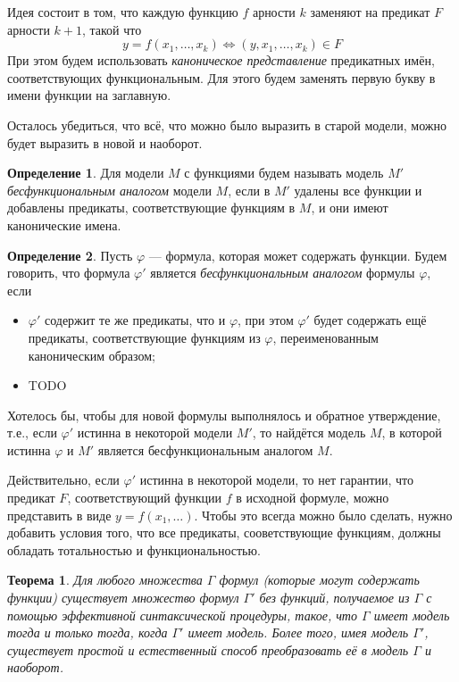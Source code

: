 \documentclass[12pt]{article}
\theoremstyle{definition}
\newtheorem{definition}{Определение}[section]
\theoremstyle{plain}
\newtheorem{theorem}{Теорема}[section]
\theoremstyle{remark}
\begin{document}
Идея состоит в том, что каждую функцию $f$ арности $k$ заменяют на
предикат $F$ арности $k + 1$, такой что
\[
  y = f(x_1, \dots, x_k) \iff (y, x_1, \dots, x_k) \in F
\]
При этом будем использовать \textit{каноническое представление}
предикатных имён, соответствующих функциональным. Для этого будем
заменять первую букву в имени функции на заглавную.

Осталось убедиться, что всё, что можно было выразить в старой модели,
можно будет выразить в новой и наоборот.

\begin{definition}
  Для модели $M$ с функциями будем называть модель $M'$
  \textit{бесфункциональным аналогом} модели $M$, если в $M'$ удалены
  все функции и добавлены предикаты, соответствующие функциям в $M$, и
  они имеют канонические имена.
\end{definition}

\begin{definition}
  Пусть $\varphi$ --- формула, которая может содержать функции. Будем
  говорить, что формула $\varphi'$ является \textit{бесфункциональным
  аналогом} формулы $\varphi$, если
  \begin{itemize}
    \item $\varphi'$ содержит те же предикаты, что и $\varphi$, при
      этом $\varphi'$ будет содержать ещё предикаты, соответствующие
      функциям из $\varphi$, переименованным каноническим образом;

    \item TODO
  \end{itemize}
\end{definition}

Хотелось бы, чтобы для новой формулы выполнялось и обратное
утверждение, т.е., если $\varphi'$ истинна в некоторой модели $M'$,
то найдётся модель $M$, в которой истинна $\varphi$ и $M'$ является
бесфункциональным аналогом $M$.

Действительно, если $\varphi'$ истинна в некоторой модели, то нет
гарантии, что предикат $F$, соответствующий функции $f$ в исходной
формуле, можно представить в виде $y = f(x_1, \dots)$. Чтобы это
всегда можно было сделать, нужно добавить условия того, что все
предикаты, сооветствующие функциям, должны обладать тотальностью и
функциональностью.

\begin{theorem}
  Для любого множества $\Gamma$ формул (которые могут содержать
  функции) существует множество формул $\Gamma'$ без функций,
  получаемое из $\Gamma$ с помощью эффективной синтаксической
  процедуры, такое, что $\Gamma$ имеет модель тогда и только тогда,
  когда $\Gamma'$ имеет модель. Более того, имея модель $\Gamma'$,
  существует простой и естественный способ преобразовать её в модель
  $\Gamma$ и наоборот.
\end{theorem}
\end{document}
